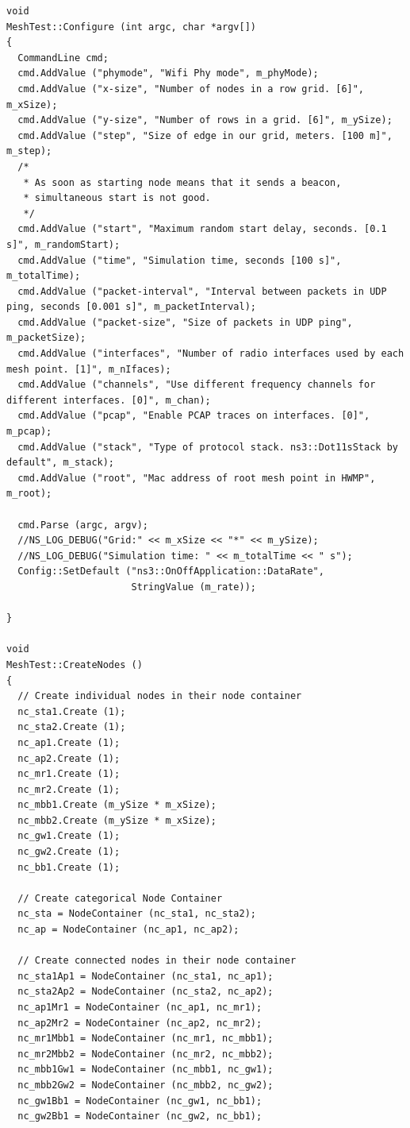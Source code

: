 \documentclass[12pt,a4paper]{report}
\begin{document}
\begin{verbatim}
void
MeshTest::Configure (int argc, char *argv[])
{
  CommandLine cmd;
  cmd.AddValue ("phymode", "Wifi Phy mode", m_phyMode);
  cmd.AddValue ("x-size", "Number of nodes in a row grid. [6]", m_xSize);
  cmd.AddValue ("y-size", "Number of rows in a grid. [6]", m_ySize);
  cmd.AddValue ("step", "Size of edge in our grid, meters. [100 m]", m_step);
  /*
   * As soon as starting node means that it sends a beacon,
   * simultaneous start is not good.
   */
  cmd.AddValue ("start", "Maximum random start delay, seconds. [0.1 s]", m_randomStart);
  cmd.AddValue ("time", "Simulation time, seconds [100 s]", m_totalTime);
  cmd.AddValue ("packet-interval", "Interval between packets in UDP ping, seconds [0.001 s]", m_packetInterval);
  cmd.AddValue ("packet-size", "Size of packets in UDP ping", m_packetSize);
  cmd.AddValue ("interfaces", "Number of radio interfaces used by each mesh point. [1]", m_nIfaces);
  cmd.AddValue ("channels", "Use different frequency channels for different interfaces. [0]", m_chan);
  cmd.AddValue ("pcap", "Enable PCAP traces on interfaces. [0]", m_pcap);
  cmd.AddValue ("stack", "Type of protocol stack. ns3::Dot11sStack by default", m_stack);
  cmd.AddValue ("root", "Mac address of root mesh point in HWMP", m_root);

  cmd.Parse (argc, argv);
  //NS_LOG_DEBUG("Grid:" << m_xSize << "*" << m_ySize);
  //NS_LOG_DEBUG("Simulation time: " << m_totalTime << " s");
  Config::SetDefault ("ns3::OnOffApplication::DataRate",
                      StringValue (m_rate));

}

void
MeshTest::CreateNodes ()
{
  // Create individual nodes in their node container
  nc_sta1.Create (1);
  nc_sta2.Create (1);
  nc_ap1.Create (1);
  nc_ap2.Create (1);
  nc_mr1.Create (1);
  nc_mr2.Create (1);
  nc_mbb1.Create (m_ySize * m_xSize);
  nc_mbb2.Create (m_ySize * m_xSize);
  nc_gw1.Create (1);
  nc_gw2.Create (1);
  nc_bb1.Create (1);

  // Create categorical Node Container
  nc_sta = NodeContainer (nc_sta1, nc_sta2);
  nc_ap = NodeContainer (nc_ap1, nc_ap2);

  // Create connected nodes in their node container
  nc_sta1Ap1 = NodeContainer (nc_sta1, nc_ap1);
  nc_sta2Ap2 = NodeContainer (nc_sta2, nc_ap2);
  nc_ap1Mr1 = NodeContainer (nc_ap1, nc_mr1);
  nc_ap2Mr2 = NodeContainer (nc_ap2, nc_mr2);
  nc_mr1Mbb1 = NodeContainer (nc_mr1, nc_mbb1);
  nc_mr2Mbb2 = NodeContainer (nc_mr2, nc_mbb2);
  nc_mbb1Gw1 = NodeContainer (nc_mbb1, nc_gw1);
  nc_mbb2Gw2 = NodeContainer (nc_mbb2, nc_gw2);
  nc_gw1Bb1 = NodeContainer (nc_gw1, nc_bb1);
  nc_gw2Bb1 = NodeContainer (nc_gw2, nc_bb1);


\end{verbatim}
\end{document}
